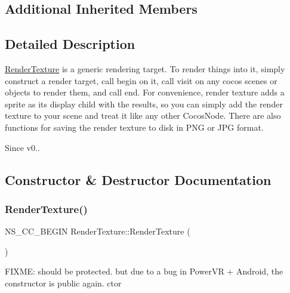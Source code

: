 \subsection*{Additional Inherited Members}


\subsection{Detailed Description}
\hyperlink{classRenderTexture}{Render\+Texture} is a generic rendering target. To render things into it, simply construct a render target, call begin on it, call visit on any cocos scenes or objects to render them, and call end. For convenience, render texture adds a sprite as it\textquotesingle{}s display child with the results, so you can simply add the render texture to your scene and treat it like any other Cocos\+Node. There are also functions for saving the render texture to disk in P\+NG or J\+PG format. 

\begin{DoxySince}{Since}
v0.. 
\end{DoxySince}


\subsection{Constructor \& Destructor Documentation}
\mbox{\label{classRenderTexture_a470aba8ca16bbe016a1db3cdce7ddf01}} 
\subsubsection{\texorpdfstring{Render\+Texture()}{RenderTexture()}\hspace{0.1cm}{\footnotesize\ttfamily [1/2]}}
{\footnotesize\ttfamily N\+S\+\_\+\+C\+C\+\_\+\+B\+E\+G\+IN Render\+Texture\+::\+Render\+Texture (\begin{DoxyParamCaption}{ }\end{DoxyParamCaption})}

F\+I\+X\+ME\+: should be protected. but due to a bug in Power\+VR + Android, the constructor is public again.  ctor \mbox{\label{classRenderTexture_a09968448696504585c6dd61203f2c5b9}} 

